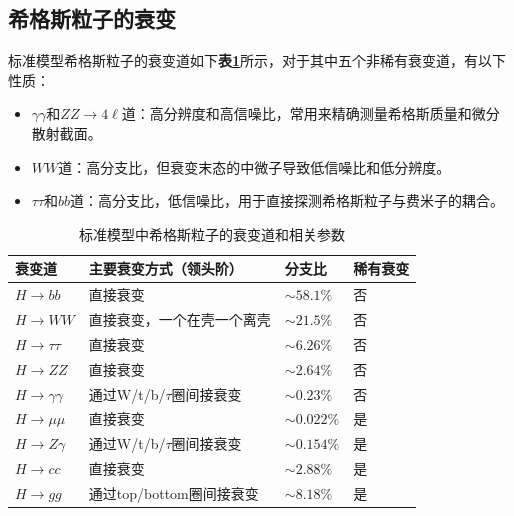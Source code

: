 \subsection{希格斯粒子的衰变}
标准模型希格斯粒子的衰变道如下\textbf{表\ref{table:2.2}}所示，对于其中五个非稀有衰变道，有以下性质：
\begin{itemize}
    \item $\gamma\gamma$和$ZZ\to4\ell$道：高分辨度和高信噪比，常用来精确测量希格斯质量和微分散射截面。
    \item $WW$道：高分支比，但衰变末态的中微子导致低信噪比和低分辨度。
    \item $\tau\tau$和$bb$道：高分支比，低信噪比，用于直接探测希格斯粒子与费米子的耦合。
\end{itemize}
\begin{table}[htbp]
    \caption{标准模型中希格斯粒子的衰变道和相关参数\cite{Higgs_cross_sections}}\label{table:2.2}
    \centering
    \begin{tabular}{>{\centering\arraybackslash}p{2cm}%
    >{\centering\arraybackslash}p{7cm}%
    >{\centering\arraybackslash}p{2cm}%
    >{\centering\arraybackslash}p{2cm}}
    \toprule\toprule
    \textbf{衰变道} & \textbf{主要衰变方式（领头阶）} & \textbf{分支比} & \textbf{稀有衰变}\\
    \midrule
    $H\to bb$ & 直接衰变 & $\sim 58.1\%$ & 否\\
    $H\to WW$ & 直接衰变，一个在壳一个离壳 & $\sim 21.5\%$ & 否\\
    $H\to\tau\tau$ & 直接衰变 & $\sim 6.26\%$ & 否\\
    $H\to ZZ$ & 直接衰变 & $\sim2.64\%$ & 否\\
    $H\to \gamma\gamma$ & 通过W/t/b/$\tau$圈间接衰变 &  $\sim0.23\%$ & 否\\
    $H\to\mu\mu$ & 直接衰变 & $\sim 0.022\%$ & 是\\
    $H\to Z\gamma$ & 通过W/t/b/$\tau$圈间接衰变 & $\sim 0.154\%$ & 是\\
    $H\to cc$ & 直接衰变 & $\sim2.88\%$ & 是\\
    $H\to gg$ & 通过top/bottom圈间接衰变 & $\sim 8.18\%$ & 是\\
    \bottomrule\bottomrule
\end{tabular}
\end{table}

